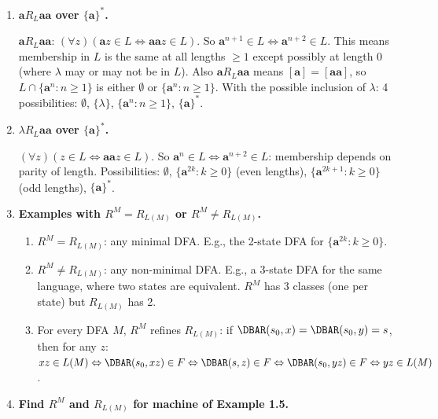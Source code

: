 \begin{enumerate}[{2.}1.]
\item \textbf{$\mathbf{a} R_L \mathbf{aa}$ over $\{\mathbf{a}\}^*$.}

$\mathbf{a} R_L \mathbf{aa}$: $(\forall z)(\mathbf{a}z\in L\Leftrightarrow\mathbf{aa}z\in L)$. So $\mathbf{a}^{n+1}\in L\Leftrightarrow\mathbf{a}^{n+2}\in L$. This means membership in $L$ is the same at all lengths $\geq 1$ except possibly at length 0 (where $\lambda$ may or may not be in $L$). Also $\mathbf{a} R_L \mathbf{aa}$ means $[\mathbf{a}]=[\mathbf{aa}]$, so $L\cap\{\mathbf{a}^n:n\geq 1\}$ is either $\emptyset$ or $\{\mathbf{a}^n:n\geq 1\}$. With the possible inclusion of $\lambda$: 4 possibilities: $\emptyset$, $\{\lambda\}$, $\{\mathbf{a}^n:n\geq 1\}$, $\{\mathbf{a}\}^*$.

\item \textbf{$\lambda R_L \mathbf{aa}$ over $\{\mathbf{a}\}^*$.}

$(\forall z)(z\in L\Leftrightarrow\mathbf{aa}z\in L)$. So $\mathbf{a}^n\in L\Leftrightarrow\mathbf{a}^{n+2}\in L$: membership depends on parity of length. Possibilities: $\emptyset$, $\{\mathbf{a}^{2k}:k\geq 0\}$ (even lengths), $\{\mathbf{a}^{2k+1}:k\geq 0\}$ (odd lengths), $\{\mathbf{a}\}^*$.

\item \textbf{Examples with $R^M=R_{L(M)}$ or $R^M\neq R_{L(M)}$.}

\begin{enumerate}
\item $R^M=R_{L(M)}$: any minimal DFA. E.g., the 2-state DFA for $\{\mathbf{a}^{2k}:k\geq 0\}$.

\item $R^M\neq R_{L(M)}$: any non-minimal DFA. E.g., a 3-state DFA for the same language, where two states are equivalent. $R^M$ has 3 classes (one per state) but $R_{L(M)}$ has 2.

\item For every DFA $M$, $R^M$ refines $R_{L(M)}$: if $\DBAR(s_0,x)=\DBAR(s_0,y)=s$, then for any $z$: $xz\in L(M)\Leftrightarrow\DBAR(s_0,xz)\in F\Leftrightarrow\DBAR(s,z)\in F\Leftrightarrow\DBAR(s_0,yz)\in F\Leftrightarrow yz\in L(M)$.
\end{enumerate}

\item \textbf{Find $R^M$ and $R_{L(M)}$ for machine of Example 1.5.}


\end{enumerate}
